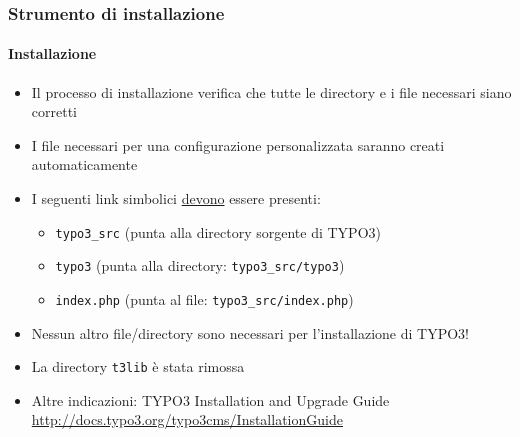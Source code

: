 
\begin{frame}[fragile]

	\frametitle{Strumento di installazione}
	\framesubtitle{Installazione}

	\begin{itemize}
		\item Il processo di installazione verifica che tutte le directory e i file necessari siano corretti
		\item I file necessari per una configurazione personalizzata saranno creati automaticamente
		\item I seguenti link simbolici \underline{devono} essere presenti:

		\begin{itemize}
			\item \texttt{typo3\_src}	\tabto{2cm} (punta alla directory sorgente di TYPO3)
			\item \texttt{typo3}		\tabto{2cm} (punta alla directory: \texttt{typo3\_src/typo3})
			\item \texttt{index.php}	\tabto{2cm} (punta al file: \texttt{typo3\_src/index.php})
		\end{itemize}

		\item Nessun altro file/directory sono necessari per l'installazione di TYPO3!
		\item La directory \texttt{t3lib} è stata rimossa
		\item Altre indicazioni: TYPO3 Installation and Upgrade Guide\newline
			\url{http://docs.typo3.org/typo3cms/InstallationGuide}

	\end{itemize}

\end{frame}


